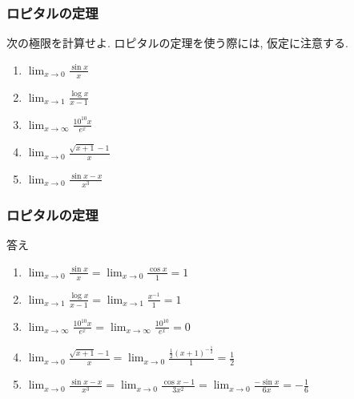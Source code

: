 \begin{frame}
\frametitle{ロピタルの定理}


\begin{Prob}
次の極限を計算せよ. ロピタルの定理を使う際には, 仮定に注意する.  \vspace{2mm}
\begin{enumerate}
\item $\displaystyle \lim_{x\to 0} \frac{\sin x}{x}$ \vspace{2mm}
\item  $\displaystyle \lim_{x\to 1} \frac{\log x}{x-1}$ \vspace{2mm}
\item $\displaystyle \lim_{x\to \infty} \frac{10^{10}x}{e^x}$ \vspace{2mm}
\item $\displaystyle \lim_{x\to 0} \frac{\sqrt{x+1}-1}{x}$ \vspace{2mm}
\item $\displaystyle \lim_{x\to 0} \frac{\sin x-x}{x^3}$ 
\end{enumerate}
\end{Prob}

\end{frame}



\begin{frame}
\frametitle{ロピタルの定理}

答え

\begin{enumerate}
\item $\displaystyle \lim_{x\to 0} \frac{\sin x}{x}= \lim_{x\to 0} \frac{\cos x}{1}=1$ \vspace{3mm}
\item  $\displaystyle \lim_{x\to 1} \frac{\log x}{x-1}= \lim_{x\to 1} \frac{x^{-1}}{1}=1$ \vspace{3mm}
\item $\displaystyle \lim_{x\to \infty} \frac{10^{10}x}{e^x}= \lim_{x\to \infty} \frac{10^{10}}{e^x}=0$ \vspace{3mm}
\item $\displaystyle \lim_{x\to 0} \frac{\sqrt{x+1}-1}{x}= \lim_{x\to 0} \frac{\frac{1}{2}(x+1)^{-\frac{1}{2}}}{1}=\frac{1}{2}$ \vspace{3mm}
\item $\displaystyle \lim_{x\to 0} \frac{\sin x-x}{x^3}= \lim_{x\to 0} \frac{\cos x-1}{3x^2}= \lim_{x\to 0} \frac{-\sin x}{6x}=-\frac{1}{6}$ 
\end{enumerate}


\end{frame}




